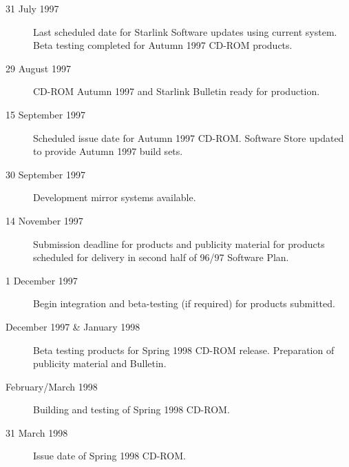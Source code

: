 \documentclass[twoside,11pt]{article}
\begin{document}
\begin{description}

\item[31 July 1997]
   Last scheduled date for Starlink Software updates using current system.
   Beta testing completed for Autumn 1997 CD-ROM products.

\item[29 August 1997]
   CD-ROM Autumn 1997 and Starlink Bulletin ready for production.

\item[15 September 1997]
   Scheduled issue date for Autumn 1997 CD-ROM.  Software Store updated to
   provide Autumn 1997 build sets.

\item[30 September 1997]
   Development mirror systems available.

\item[14 November 1997]
   Submission deadline for products and publicity material for products
   scheduled for delivery in second half of 96/97 Software Plan.

\item[1 December 1997]
   Begin integration and beta-testing (if required) for products submitted.

\item[December 1997 \& January 1998]
   Beta testing products for Spring 1998 CD-ROM release.
   Preparation of publicity material and Bulletin.

\item[February/March 1998]
   Building and testing of Spring 1998 CD-ROM.

\item[31 March 1998]
   Issue date of Spring 1998 CD-ROM.

\end{description}
\end{document}
